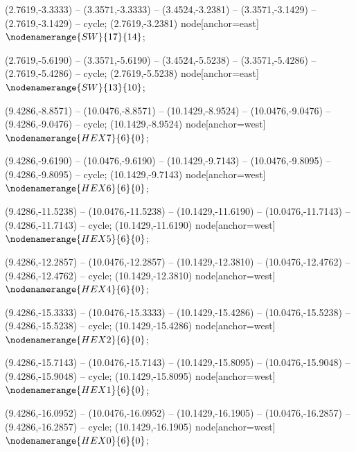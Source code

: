    (2.7619,-3.3333) -- (3.3571,-3.3333) -- (3.4524,-3.2381) -- (3.3571,-3.1429) -- (2.7619,-3.1429) -- cycle;
   (2.7619,-3.2381) node[anchor=east] {$\nodenamerange{SW}{17}{14}$};

   (2.7619,-5.6190) -- (3.3571,-5.6190) -- (3.4524,-5.5238) -- (3.3571,-5.4286) -- (2.7619,-5.4286) -- cycle;
   (2.7619,-5.5238) node[anchor=east] {$\nodenamerange{SW}{13}{10}$};

   (9.4286,-8.8571) -- (10.0476,-8.8571) -- (10.1429,-8.9524) -- (10.0476,-9.0476) -- (9.4286,-9.0476) -- cycle;
   (10.1429,-8.9524) node[anchor=west] {$\nodenamerange{HEX7}{6}{0}$};

   (9.4286,-9.6190) -- (10.0476,-9.6190) -- (10.1429,-9.7143) -- (10.0476,-9.8095) -- (9.4286,-9.8095) -- cycle;
   (10.1429,-9.7143) node[anchor=west] {$\nodenamerange{HEX6}{6}{0}$};

   (9.4286,-11.5238) -- (10.0476,-11.5238) -- (10.1429,-11.6190) -- (10.0476,-11.7143) -- (9.4286,-11.7143) -- cycle;
   (10.1429,-11.6190) node[anchor=west] {$\nodenamerange{HEX5}{6}{0}$};

   (9.4286,-12.2857) -- (10.0476,-12.2857) -- (10.1429,-12.3810) -- (10.0476,-12.4762) -- (9.4286,-12.4762) -- cycle;
   (10.1429,-12.3810) node[anchor=west] {$\nodenamerange{HEX4}{6}{0}$};

   (9.4286,-15.3333) -- (10.0476,-15.3333) -- (10.1429,-15.4286) -- (10.0476,-15.5238) -- (9.4286,-15.5238) -- cycle;
   (10.1429,-15.4286) node[anchor=west] {$\nodenamerange{HEX2}{6}{0}$};

   (9.4286,-15.7143) -- (10.0476,-15.7143) -- (10.1429,-15.8095) -- (10.0476,-15.9048) -- (9.4286,-15.9048) -- cycle;
   (10.1429,-15.8095) node[anchor=west] {$\nodenamerange{HEX1}{6}{0}$};

   (9.4286,-16.0952) -- (10.0476,-16.0952) -- (10.1429,-16.1905) -- (10.0476,-16.2857) -- (9.4286,-16.2857) -- cycle;
   (10.1429,-16.1905) node[anchor=west] {$\nodenamerange{HEX0}{6}{0}$};

